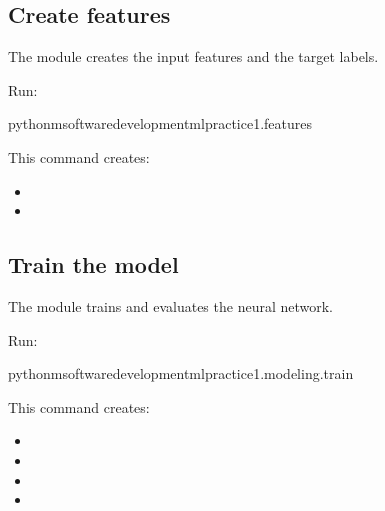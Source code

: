 \documentclass[letterpaper,10pt,english]{sphinxmanual}
\begin{document}
\subsection{Create features}
\label{\detokenize{usage:create-features}}
\sphinxAtStartPar
The  module creates the input features and the target labels.

\sphinxAtStartPar
Run:

\begin{sphinxVerbatim}[commandchars=\\\{\}]
python\PYGZhy{}msoftware\PYGZus{}development\PYGZus{}ml\PYGZus{}practice\PYGZus{}1.features
\end{sphinxVerbatim}

\sphinxAtStartPar
This command creates:
\begin{itemize}
\item {} 
\sphinxAtStartPar
{}

\item {} 
\sphinxAtStartPar
{}

\end{itemize}


\subsection{Train the model}
\label{\detokenize{usage:train-the-model}}
\sphinxAtStartPar
The  module trains and evaluates the neural network.

\sphinxAtStartPar
Run:

\begin{sphinxVerbatim}[commandchars=\\\{\}]
python\PYGZhy{}msoftware\PYGZus{}development\PYGZus{}ml\PYGZus{}practice\PYGZus{}1.modeling.train
\end{sphinxVerbatim}

\sphinxAtStartPar
This command creates:
\begin{itemize}
\item {} 
\sphinxAtStartPar
{}

\item {} 
\sphinxAtStartPar
{}

\item {} 
\sphinxAtStartPar
{}

\item {} 
\sphinxAtStartPar
{}

\end{itemize}
\end{document}
